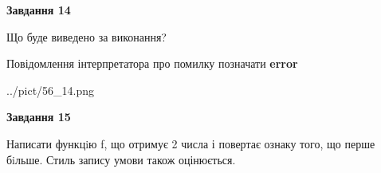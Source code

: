\documentclass[11pt, ukrainian]{article}
\begin{document}
{\begin {large}
{\begin {center}\textbf{Завдання 14}\end {center}}\par
Що буде виведено за виконання? \par
Повідомлення інтерпретатора про помилку позначати \textbf{error}

\begin{center}
	{../pict/56_14.png}
\end{center}
\newpage

{\begin {center}\textbf{Завдання 15}\end {center}}\par

Написати функцiю f, що отримує 2 числа і повертає ознаку того, що перше бiльше. Стиль запису умови також оцінюється.\par
\newpage

\end {large}}
\end{document}
